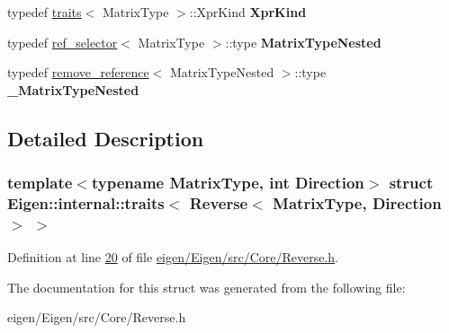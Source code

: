 \begin{DoxyCompactItemize}
typedef \hyperlink{struct_eigen_1_1internal_1_1traits}{traits}$<$ Matrix\+Type $>$\+::Xpr\+Kind {\bfseries Xpr\+Kind}
\item 
\mbox{\label{struct_eigen_1_1internal_1_1traits_3_01_reverse_3_01_matrix_type_00_01_direction_01_4_01_4_a29a753d24c5bd3262a9b5aa1ae177e52}} 
typedef \hyperlink{struct_eigen_1_1internal_1_1ref__selector}{ref\+\_\+selector}$<$ Matrix\+Type $>$\+::type {\bfseries Matrix\+Type\+Nested}
\item 
\mbox{\label{struct_eigen_1_1internal_1_1traits_3_01_reverse_3_01_matrix_type_00_01_direction_01_4_01_4_ac3990c23f2fc7e589f671145407b4649}} 
typedef \hyperlink{struct_eigen_1_1internal_1_1remove__reference}{remove\+\_\+reference}$<$ Matrix\+Type\+Nested $>$\+::type {\bfseries \+\_\+\+Matrix\+Type\+Nested}
\end{DoxyCompactItemize}


\subsection{Detailed Description}
\subsubsection*{template$<$typename Matrix\+Type, int Direction$>$\newline
struct Eigen\+::internal\+::traits$<$ Reverse$<$ Matrix\+Type, Direction $>$ $>$}



Definition at line \hyperlink{eigen_2_eigen_2src_2_core_2_reverse_8h_source_l00020}{20} of file \hyperlink{eigen_2_eigen_2src_2_core_2_reverse_8h_source}{eigen/\+Eigen/src/\+Core/\+Reverse.\+h}.



The documentation for this struct was generated from the following file\+:\begin{DoxyCompactItemize}
\item 
eigen/\+Eigen/src/\+Core/\+Reverse.\+h\end{DoxyCompactItemize}
